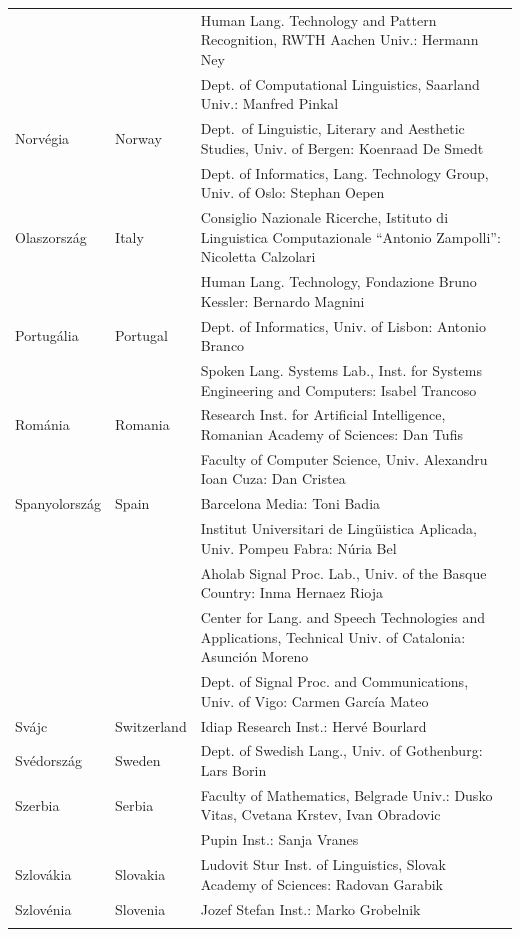 \begin{longtable}{llp{105mm}}
    & & Human Lang. Technology and Pattern Recognition, RWTH Aachen Univ.: Hermann Ney \\ \addlinespace
    & & Dept. of Computational Linguistics, Saarland Univ.: Manfred Pinkal\\ \addlinespace
    Norvégia & \textcolor{grey1}{Norway} & Dept.~of Linguistic, Literary and Aesthetic Studies, Univ. of Bergen: Koenraad De Smedt\\ \addlinespace 
    & & Dept. of Informatics, Lang. Technology Group, Univ. of Oslo: Stephan Oepen \\ \addlinespace
    Olaszország & \textcolor{grey1}{Italy} & Consiglio Nazionale Ricerche, Istituto di Linguistica Computazionale “Antonio Zampolli”: Nicoletta Calzolari\\ \addlinespace
    & & Human Lang. Technology, Fondazione Bruno Kessler: Bernardo Magnini\\ \addlinespace
    Portugália & \textcolor{grey1}{Portugal} & Dept. of Informatics, Univ. of Lisbon: Antonio Branco\\ \addlinespace
    & & Spoken Lang. Systems Lab., Inst. for Systems Engineering and Computers: Isabel Trancoso \\ \addlinespace
    Románia & \textcolor{grey1}{Romania} & Research Inst. for Artificial Intelligence, Romanian Academy of Sciences: Dan Tufis \\ \addlinespace
    & & Faculty of Computer Science, Univ. Alexandru Ioan Cuza: Dan Cristea \\ \addlinespace
    Spanyolország & \textcolor{grey1}{Spain} & Barcelona Media: Toni Badia \\ \addlinespace 
    & & Institut Universitari de Lingüistica Aplicada, Univ. Pompeu Fabra: Núria Bel \\ \addlinespace 
    & & Aholab Signal Proc. Lab., Univ. of the Basque Country: Inma Hernaez Rioja \\ \addlinespace 
    & & Center for Lang. and Speech Technologies and Applications, Technical Univ. of Catalonia: Asunción Moreno \\ \addlinespace 
    & & Dept. of Signal Proc. and Communications, Univ. of Vigo: Carmen García Mateo \\ \addlinespace
    Svájc & \textcolor{grey1}{Switzerland} & Idiap Research Inst.: Hervé Bourlard \\ \addlinespace
    Svédország & \textcolor{grey1}{Sweden} & Dept. of Swedish Lang., Univ. of Gothenburg: Lars Borin \\ \addlinespace 
    Szerbia & \textcolor{grey1}{Serbia} & Faculty of Mathematics, Belgrade Univ.: Dusko Vitas, Cvetana Krstev, Ivan Obradovic \\ \addlinespace
    & & Pupin Inst.: Sanja Vranes \\ \addlinespace  
    Szlovákia & \textcolor{grey1}{Slovakia} & Ludovit Stur Inst. of Linguistics, Slovak Academy of Sciences: Radovan Garabik \\ \addlinespace 
    Szlovénia & \textcolor{grey1}{Slovenia} & Jozef Stefan Inst.: Marko Grobelnik \\ \addlinespace 
  \end{longtable}
  \normalsize

